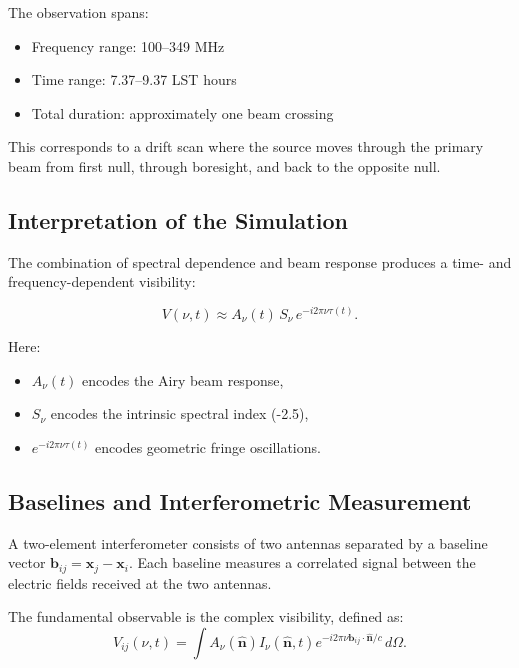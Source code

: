 \documentclass{article}
\begin{document}
The observation spans:

\begin{itemize}
    \item Frequency range: 100--349 MHz
    \item Time range: 7.37--9.37 LST hours
    \item Total duration: approximately one beam crossing
\end{itemize}

This corresponds to a drift scan where the source moves through the primary beam from first null, through boresight, and back to the opposite null.

\subsection{Interpretation of the Simulation}

The combination of spectral dependence and beam response produces a time- and frequency-dependent visibility:

\begin{equation}
V(\nu,t) \approx A_\nu(t)\, S_\nu\, e^{-i2\pi\nu\tau(t)}.
\end{equation}

Here:
\begin{itemize}
    \item $A_\nu(t)$ encodes the Airy beam response,
    \item $S_\nu$ encodes the intrinsic spectral index (-2.5),
    \item $e^{-i2\pi\nu\tau(t)}$ encodes geometric fringe oscillations.
\end{itemize}
\subsection{Baselines and Interferometric Measurement}

A two-element interferometer consists of two antennas separated by a baseline vector $\mathbf{b}_{ij} = \mathbf{x}_j - \mathbf{x}_i$. Each baseline measures a correlated signal between the electric fields received at the two antennas.

The fundamental observable is the complex visibility, defined as:
\begin{equation}
V_{ij}(\nu,t) =
\int
A_\nu(\hat{\mathbf{n}})
I_\nu(\hat{\mathbf{n}},t)
e^{-i2\pi\nu \mathbf{b}_{ij}\cdot \hat{\mathbf{n}}/c}
\, d\Omega.
\end{equation}
\end{document}
